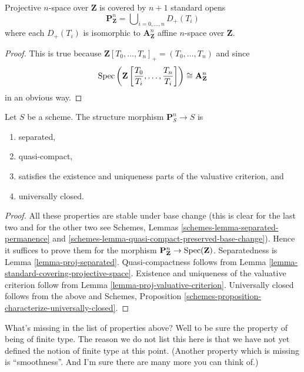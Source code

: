\begin{lemma}
\label{lemma-standard-covering-projective-space}
Projective $n$-space over $\mathbf{Z}$ is covered by
$n + 1$ standard opens
$$
\mathbf{P}^n_{\mathbf{Z}} =
\bigcup\nolimits_{i = 0, \ldots, n} D_{+}(T_i)
$$
where each $D_{+}(T_i)$ is isomorphic to $\mathbf{A}^n_{\mathbf{Z}}$
affine $n$-space over $\mathbf{Z}$.
\end{lemma}

\begin{proof}
This is true because
$\mathbf{Z}[T_0, \ldots, T_n]_{+} = (T_0, \ldots, T_n)$ and
since
$$
\mathop{\rm Spec}
\left(
\mathbf{Z}
\left[\frac{T_0}{T_i}, \ldots, \frac{T_n}{T_i}
\right]
\right)
\cong
\mathbf{A}^n_{\mathbf{Z}}
$$
in an obvious way.
\end{proof}

\begin{lemma}
\label{lemma-projective-space-separated}
Let $S$ be a scheme.
The structure morphism $\mathbf{P}^n_S \to S$ is
\begin{enumerate}
\item separated,
\item quasi-compact,
\item satisfies the existence and uniqueness parts of the valuative criterion,
and
\item universally closed.
\end{enumerate}
\end{lemma}

\begin{proof}
All these properties are stable under base change (this is clear for the
last two and for the other two see
Schemes, Lemmas
\ref{schemes-lemma-separated-permanence} and
\ref{schemes-lemma-quasi-compact-preserved-base-change}).
Hence it suffices to prove them for the morphism
$\mathbf{P}^n_{\mathbf{Z}} \to \mathop{\rm Spec}(\mathbf{Z})$.
Separatedness is Lemma \ref{lemma-proj-separated}. Quasi-compactness follows
from Lemma \ref{lemma-standard-covering-projective-space}.
Existence and uniqueness of the valuative criterion follow from
Lemma \ref{lemma-proj-valuative-criterion}.
Universally closed follows from the above and
Schemes, Proposition \ref{schemes-proposition-characterize-universally-closed}.
\end{proof}

\begin{remark}
\label{remark-missing-finite-type}
What's missing in the list of properties above? Well to be sure the property
of being of finite type. The reason we do not list this here is that we have
not yet defined the notion of finite type at this point. (Another property
which is missing is ``smoothness''. And I'm sure there are many more you can
think of.)
\end{remark}

